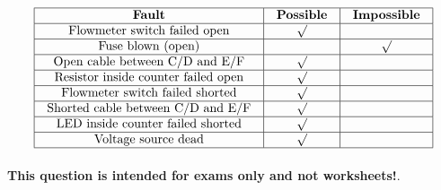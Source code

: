 






$$\vbox{\offinterlineskip
\halign{\strut
\vrule \quad\hfil # \ \hfil & 
\vrule \quad\hfil # \ \hfil & 
\vrule \quad\hfil # \ \hfil \vrule \cr
\noalign{\hrule}
%
{\bf Fault} & {\bf Possible} & {\bf Impossible} \cr
%
\noalign{\hrule}
%
Flowmeter switch failed open & $\surd$ &  \cr
%
\noalign{\hrule}
%
Fuse blown (open) &  & $\surd$ \cr
%
\noalign{\hrule}
%
Open cable between C/D and E/F & $\surd$ &  \cr
%
\noalign{\hrule}
%
Resistor inside counter failed open & $\surd$ &  \cr
%
\noalign{\hrule}
%
Flowmeter switch failed shorted & $\surd$ &  \cr
%
\noalign{\hrule}
%
Shorted cable between C/D and E/F & $\surd$ &  \cr
%
\noalign{\hrule}
%
LED inside counter failed shorted & $\surd$ &  \cr
%
\noalign{\hrule}
%
Voltage source dead & $\surd$ &  \cr
%
\noalign{\hrule}
} %
}$$ %








{\bf This question is intended for exams only and not worksheets!}.


